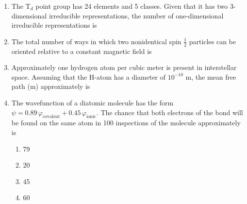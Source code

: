 \documentclass[12pt]{article}
\begin{document}
\begin{enumerate}
\item The T$_d$ point group has 24 elements and 5 classes. Given that it has two 3-dimensional irreducible representations, the number of one-dimensional irreducible representations is
\begin{enumerate}
\end{enumerate}

\item The total number of ways in which two nonidentical spin $\frac{1}{2}$ particles can be oriented relative to a constant magnetic field is
\begin{enumerate}
\end{enumerate}


\item Approximately one hydrogen atom per cubic meter is present in interstellar space. Assuming that the H-atom has a diameter of $10^{-10}$ m, the mean free path (m) approximately is
\begin{enumerate}
    \hfill{}
\end{enumerate}

\item The wavefunction of a diatomic molecule has the form $\psi = 0.89\, \varphi_{\text{covalent}} + 0.45\, \varphi_{\text{ionic}}$. The chance that both electrons of the bond will be found on the same atom in 100 inspections of the molecule approximately is

\begin{enumerate}
\item 79
\item 20
\item 45
\item 60
\end{enumerate}    \hfill{}





\end{enumerate}
\end{document}
